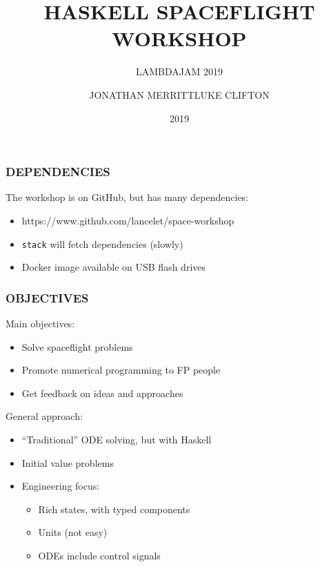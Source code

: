 \documentclass{beamer}
\begin{document}
\title{HASKELL SPACEFLIGHT WORKSHOP}
\author{JONATHAN MERRITT\hspace{0.5em}{\footnotesize\&}\hspace{0.5em}LUKE CLIFTON}
\subtitle{LAMBDAJAM 2019}
\date{2019}

\begin{frame}
  \titlepage
\end{frame}

\begin{frame}
  \frametitle{DEPENDENCIES}
  The workshop is on GitHub, but has many dependencies:
  \begin{itemize}
    \item https://www.github.com/lancelet/space-workshop
    \item \texttt{stack} will fetch dependencies (slowly)
    \item Docker image available on USB flash drives
  \end{itemize}
\end{frame}

\begin{frame}
  \frametitle{OBJECTIVES}
  Main objectives:
  \begin{itemize}
    \item Solve spaceflight problems
    \item Promote numerical programming to FP people
    \item Get feedback on ideas and approaches
  \end{itemize}
  \vspace{1em}
  General approach:
  \begin{itemize}
    \item ``Traditional'' ODE solving, but with Haskell
    \item Initial value problems
    \item Engineering focus:
      \begin{itemize}
        \item Rich states, with typed components
        \item Units (not easy) 
        \item ODEs include control signals
      \end{itemize}
  \end{itemize}
\end{frame}
\end{document}
